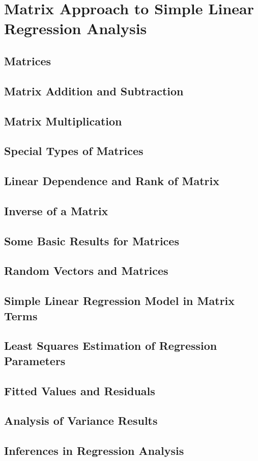 \section{Matrix Approach to Simple Linear Regression Analysis}
\subsection{Matrices}

\subsection{Matrix Addition and Subtraction}

\subsection{Matrix Multiplication}

\subsection{Special Types of Matrices}

\subsection{Linear Dependence and Rank of Matrix}

\subsection{Inverse of a Matrix}

\subsection{Some Basic Results for Matrices}

\subsection{Random Vectors and Matrices}

\subsection{Simple Linear Regression Model in Matrix Terms}

\subsection{Least Squares Estimation of Regression Parameters}

\subsection{Fitted Values and Residuals}

\subsection{Analysis of Variance Results}

\subsection{Inferences in Regression Analysis}

